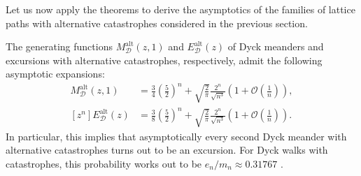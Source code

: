 Let us now apply the theorems to derive the asymptotics of the families of lattice paths with alternative catastrophes considered in the previous section.

\begin{corollary} \label{cor:dyck_asym}
  The generating functions $M_\mathcal{D}^\mathrm{alt}(z,1)$ and $E_\mathcal{D}^\mathrm{alt}(z)$ of Dyck meanders and excursions with alternative catastrophes, respectively, admit the following asymptotic expansions: 
  \begin{align*}
    [z^{n}]M_\mathcal{D}^\mathrm{alt}(z,1) &= \frac{3}{4}\left(\frac{5}{2}\right)^{n} + \sqrt{\frac{2}{\pi}}\frac{2^{n}}{\sqrt{n^3}}\left(1 + \mathcal{O}\left(\frac{1}{n}\right)\right), \\
    [z^{n}]E_\mathcal{D}^\mathrm{alt}(z) &= \frac{3}{8}\left(\frac{5}{2}\right)^{n} + \sqrt{\frac{2}{\pi}}\frac{2^{n}}{\sqrt{n^3}}\left(1 + \mathcal{O}\left(\frac{1}{n}\right)\right).
  \end{align*}
  In particular, this implies that asymptotically every second Dyck meander with alternative catastrophes turns out to be an excursion. For Dyck walks with catastrophes, this probability works out to be $e_n/m_n \approx 0.31767$ \cite[Corollary 4.9]{Catastrophes}.
\end{corollary}

